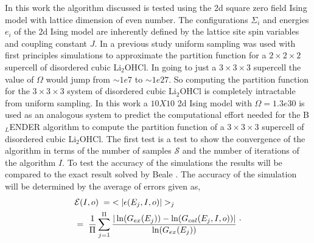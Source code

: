 \documentclass[aps,prl,reprint,superscriptaddress,showkeys]{revtex4-1}
\begin{document}
In this work the algorithm discussed is tested using the 2d square zero field  Ising model with lattice dimension of even number\cite{exact_statistical,Onsager,Ising}.  The configurations $\Sigma_i$ and energies $e_i$ of the 2d Ising model are inherently defined by the lattice site spin variables and coupling constant $J$. In a previous study\cite{partition} uniform sampling was used with first principles simulations to approximate the partition function for a $2\times 2\times 2$ supercell  of disordered cubic Li$_2$OHCl. In going to just a $3\times 3\times 3$ supercell the value of $\Omega$ would jump from $\sim 1e7$ to  $\sim 1e27$. So computing the partition function for the $3\times 3\times 3$ system of disordered cubic Li$_2$OHCl is completely intractable from uniform sampling. In this work a $10X10$ 2d Ising model with $\Omega = 1.3e30$ is used as an analogous system to predict the computational effort needed for the B$_L$ENDER algorithm to compute the partition function of a  $3\times 3\times 3$ supercell of disordered cubic Li$_2$OHCl.  The first test is a test to show the convergence of the algorithm in terms of the number of samples $\mathcal{S}$ and the number of iterations of the algorithm $I$. To test the accuracy of the simulations the results will be compared to the exact result solved by Beale \cite{Beale_2d_ising}. The accuracy of the simulation will be determined by the average of errors given as, 
\begin{equation}
\begin{split}
 &\mathcal{E}(I,o) \hspace{0.1cm}= \hspace{0.1cm}< |\epsilon(E_j,I,o)| >_j\\
& = \hspace{0.1cm}  \frac{1}{\Pi} \sum_{j=1}^{\Pi}\frac{|\ln(G_{ex}(E_j))- \ln(G_{cal}(E_j,I,o))|}{\ln(G_{ex}(E_j))}\; 
 \end{split}. 
\end{equation}
\end{document}
